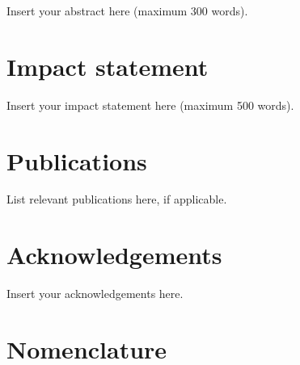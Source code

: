 Insert your abstract here (maximum 300 words).

\cleardoublepage
\chapter*{Impact statement}

Insert your impact statement here (maximum 500 words).

\cleardoublepage
\chapter*{Publications}

List relevant publications here, if applicable.

\cleardoublepage
\chapter*{Acknowledgements}

Insert your acknowledgements here.

\cleardoublepage
\tableofcontents

\cleardoublepage
{}
{}
\listoffigures

\cleardoublepage
{}
{}
\listoftables

\cleardoublepage
{}
\chapter*{Nomenclature}
\renewcommand{\glossarysection}[2][]{\section*{#2}}
\printnoidxglossary[type=symbols, title=Symbols]
\printnoidxglossary[type=\acronymtype, title=Acronyms]
\glsresetall